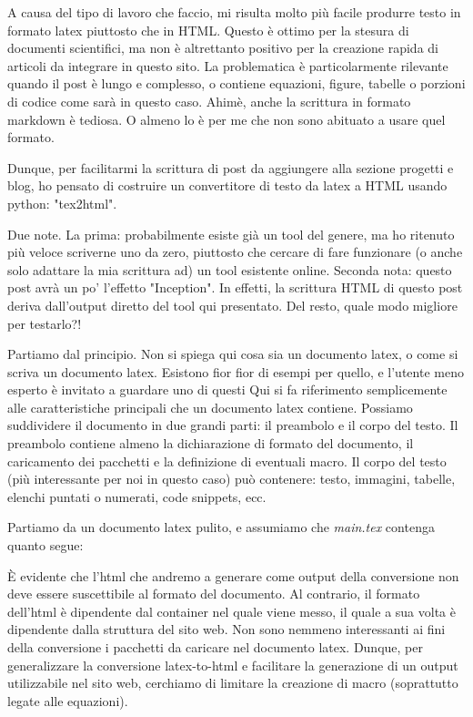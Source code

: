 A causa del tipo di lavoro che faccio, mi risulta molto più facile produrre testo in formato latex piuttosto che in HTML. Questo è ottimo per la stesura di documenti scientifici, ma non è altrettanto positivo per la creazione rapida di articoli da integrare in questo sito. La problematica è particolarmente rilevante quando il post è lungo e complesso, o contiene equazioni, figure, tabelle o porzioni di codice come sarà in questo caso. Ahimè, anche la scrittura in formato markdown è tediosa. O almeno lo è per me che non sono abituato a usare quel formato. 

Dunque, per facilitarmi la scrittura di post da aggiungere alla sezione progetti e blog, ho pensato di costruire un convertitore di testo da latex a HTML usando python: "tex2html". 

Due note. La prima: probabilmente esiste già un tool del genere, ma ho ritenuto più veloce scriverne uno da zero, piuttosto che cercare di fare funzionare (o anche solo adattare la mia scrittura ad) un tool esistente online. Seconda nota: questo post avrà un po' l'effetto "Inception". In effetti, la scrittura HTML di questo post deriva dall'output diretto del tool qui presentato. Del resto, quale modo migliore per testarlo?!

Partiamo dal principio. Non si spiega qui cosa sia un documento latex, o come si scriva un documento latex. Esistono fior fior di esempi per quello, e l'utente meno esperto è invitato a guardare uno di questi %
Qui si fa riferimento semplicemente alle caratteristiche principali che un documento latex contiene. Possiamo suddividere il documento in due grandi parti: il preambolo e il corpo del testo. Il preambolo contiene almeno la dichiarazione di formato del documento, il caricamento dei pacchetti e la definizione di eventuali macro. Il corpo del testo (più interessante per noi in questo caso) può contenere: testo, immagini, tabelle, elenchi puntati o numerati, code snippets, ecc. 

Partiamo da un documento latex pulito, e assumiamo che \textit{main.tex} contenga quanto segue:


È evidente che l'html che andremo a generare come output della conversione non deve essere suscettibile al formato del documento. Al contrario, il formato dell'html è dipendente dal container nel quale viene messo, il quale a sua volta è dipendente dalla struttura del sito web. Non sono nemmeno interessanti ai fini della conversione i pacchetti da caricare nel documento latex. Dunque, per generalizzare la conversione latex-to-html e facilitare la generazione di un output utilizzabile nel sito web, cerchiamo di limitare la creazione di macro (soprattutto legate alle equazioni). 

